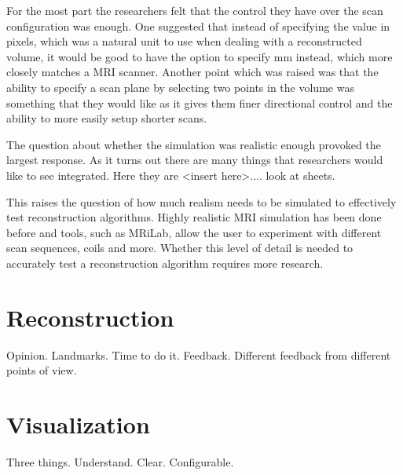 For the most part the researchers felt that the control they have over the scan configuration was enough. One suggested that instead of specifying the value in pixels, which was a natural unit to use when dealing with a reconstructed volume, it would be good to have the option to specify mm instead, which more closely matches a MRI scanner. Another point which was raised was that the ability to specify a scan plane by selecting two points in the volume was something that they would like as it gives them finer directional control and the ability to more easily setup shorter scans.

The question about whether the simulation was realistic enough provoked the largest response. As it turns out there are many things that researchers would like to see integrated. Here they are <insert here>.... look at sheets.

This raises the question of how much realism needs to be simulated to effectively test reconstruction algorithms. Highly realistic MRI simulation has been done before and tools, such as MRiLab\cite{mrilab}, allow the user to experiment with different scan sequences, coils and more. Whether this level of detail is needed to accurately test a reconstruction algorithm requires more research.

\section{Reconstruction}
Opinion. Landmarks. Time to do it. Feedback. Different feedback from different points of view.

\section{Visualization}
Three things. Understand. Clear. Configurable.

